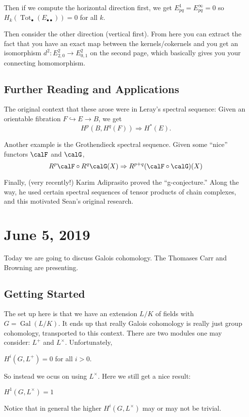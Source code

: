 \documentclass[12pt]{article}
\begin{document}
Then if we compute the horizontal direction first, we get $E_{pq}^1=E_{pq}^\infty=0$ so $H_k(\operatorname{Tot}_\bullet(E_{\bullet\bullet}))=0$ for all $k$.

Then consider the other direction (vertical first). From here you can extract the fact that you have an exact map between the kernels/cokernels 
and you get an isomorphism $d^2:E_{2,0}^2\to E_{0,1}^2$ on the second page, which basically gives you your connecting homomorphism.

\subsection{Further Reading and Applications}
The original context that these arose were in Leray's spectral sequence: Given an orientable fibration $F\hookrightarrow E\to B$, 
we get 
\[H^p(B,H^q(F))\Rightarrow H^\ast(E).\]

Another example is the Grothendieck spectral sequence. Given some ``nice'' functors $\calF$ and $\calG$, 
\[R^p\calF\circ R^q\calG(X)\Rightarrow R^{p+q}(\calF\circ \calG)(X)\]

Finally, (very recently!) Karim Adiprasito proved the ``g-conjecture.'' Along the way, he used certain spectral sequences 
of tensor products of chain complexes, and this motivated Sean's original research.

\section{June 5, 2019}
Today we are going to discuss Galois cohomology. The Thomases Carr and Browning are presenting.

\subsection{Getting Started}
The set up here is that we have an extension $L/K$ of fields with $G=\operatorname{Gal}(L/K)$. It ends up that really Galois cohomology is 
really just group cohomology, transported to this context. There are two modules one may consider: $L^+$ and $L^\times$. Unfortunately,
\begin{thm}
	$H^i(G,L^+)=0$ for all $i>0$.
\end{thm}
So instead we ocus on using $L^\times.$ Here we still get a nice result:
\begin{thm}
	$H^1(G,L^\times)=1$ 
\end{thm}
\begin{rmk}
	Notice that in general the higher $H^i(G,L^\times)$ may or may not be trivial.
\end{rmk}
\end{document}
